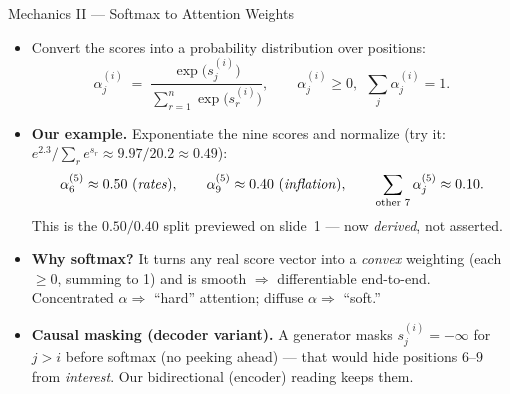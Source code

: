 \begin{frame}{Mechanics II --- Softmax to Attention Weights}
\begin{itemize}
\item Convert the scores into a probability distribution over positions:
\[
   \alpha_{j}^{(i)} \;=\; \frac{\exp\bigl(s_{j}^{(i)}\bigr)}{\sum_{r=1}^{n}\exp\bigl(s_{r}^{(i)}\bigr)},
   \qquad \alpha_{j}^{(i)} \ge 0, \ \ \sum_{j}\alpha_{j}^{(i)} = 1.
\]

\medskip
\item \textbf{Our example.} Exponentiate the nine scores and normalize (try it: $e^{2.3}/\sum_r e^{s_r} \approx 9.97/20.2 \approx 0.49$):
\[
   \alpha_{6}^{(5)} \approx 0.50\ (\text{\emph{rates}}), \qquad
   \alpha_{9}^{(5)} \approx 0.40\ (\text{\emph{inflation}}), \qquad
   \sum_{\text{other 7}} \alpha_{j}^{(5)} \approx 0.10.
\]
This is the $0.50/0.40$ split previewed on slide~1 --- now \emph{derived}, not asserted.
\smallskip
\item \textbf{Why softmax?} It turns any real score vector into a \emph{convex} weighting (each $\ge 0$, summing to 1) and is smooth $\Rightarrow$ differentiable end-to-end. Concentrated $\alpha \Rightarrow$ ``hard'' attention; diffuse $\alpha \Rightarrow$ ``soft.''
\smallskip
\item \textbf{Causal masking (decoder variant).} A generator masks $s_j^{(i)} = -\infty$ for $j>i$ before softmax (no peeking ahead) --- that would hide positions $6\text{--}9$ from \emph{interest}. Our bidirectional (encoder) reading keeps them.
\end{itemize}
\end{frame}

